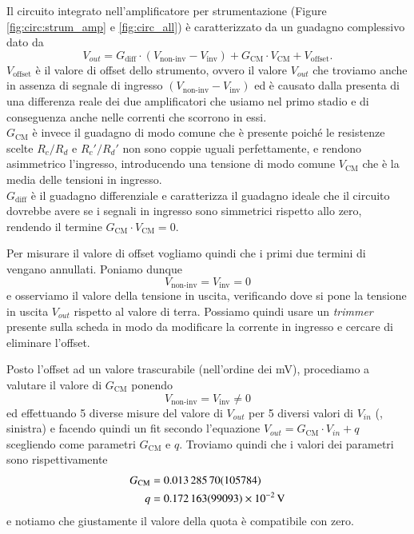\documentclass[
    rmp,
    reprint, 
    superscriptaddress, 
    altaffilletter, 
    amsmath, 
    amssymb,
    a4paper]{revtex4-2}
\begin{document}
Il circuito integrato nell'amplificatore per strumentazione (Figure \ref{fig:circ:strum_amp} e \ref{fig:circ_all}) è caratterizzato da un guadagno complessivo dato da \begin{equation}V_{out} = G_{\text{diff}}\cdot \left(V_{\text{non-inv}}-V_{\text{inv}}\right) +  G_{\text{CM}}\cdot V_{\text{CM}} + V_{\text{offset}}.\label{eq:V_out=GtotVin}\end{equation}
$V_{\text{offset}}$ è il valore di offset dello strumento, ovvero il valore $V_{out}$ che troviamo anche in assenza di segnale di ingresso $\left(V_{\text{non-inv}}-V_{\text{inv}}\right)$ ed è causato dalla presenta di una differenza reale dei due amplificatori che usiamo nel primo stadio e di conseguenza anche nelle correnti che scorrono in essi.\\
$G_{\text{CM}}$ è invece il guadagno di modo comune che è presente poiché le resistenze scelte $R_c/R_d$ e $R_c'/R_d'$ non sono coppie uguali perfettamente, e rendono asimmetrico l'ingresso, introducendo una tensione di modo comune $V_{\text{CM}}$ che è la media delle tensioni in ingresso.\\
$G_{\text{diff}}$ è il guadagno differenziale e caratterizza il guadagno ideale che il circuito dovrebbe avere se i segnali in ingresso sono simmetrici rispetto allo zero, rendendo il termine $G_{\text{CM}}\cdot V_{\text{CM}} = 0$. 

Per misurare il valore di offset vogliamo quindi che i primi due termini di  vengano annullati. Poniamo dunque \[V_{\text{non-inv}}=V_{\text{inv}}=0\] e osserviamo il valore della tensione in uscita, verificando dove si pone la tensione in uscita $V_{out}$ rispetto al valore di terra.
Possiamo quindi usare un \emph{trimmer} presente sulla scheda in modo da modificare la corrente in ingresso e cercare di eliminare l'offset.

Posto l'offset ad un valore trascurabile (nell'ordine dei \unit{\milli\volt}), procediamo a valutare il valore di $G_{\text{CM}}$ ponendo \[V_{\text{non-inv}}=V_{\text{inv}}\neq0\]
ed effettuando 5 diverse misure del valore di $V_{out}$ per 5 diversi valori di $V_{in}$ (, sinistra) e facendo quindi un fit secondo l'equazione $V_{out}=G_{\text{CM}}\cdot V_{in}+q$ scegliendo come parametri $G_{\text{CM}}$ e $q$. Troviamo quindi che i valori dei parametri sono rispettivamente
\begin{align*}
    G_{\text{CM}} &=\num{0.0132857+-0.00105784} \\
    q &=\SI{0.172163+-0.099093e-2}{\volt} \\
\end{align*}
e notiamo che giustamente il valore della quota è compatibile con zero.
\end{document}
